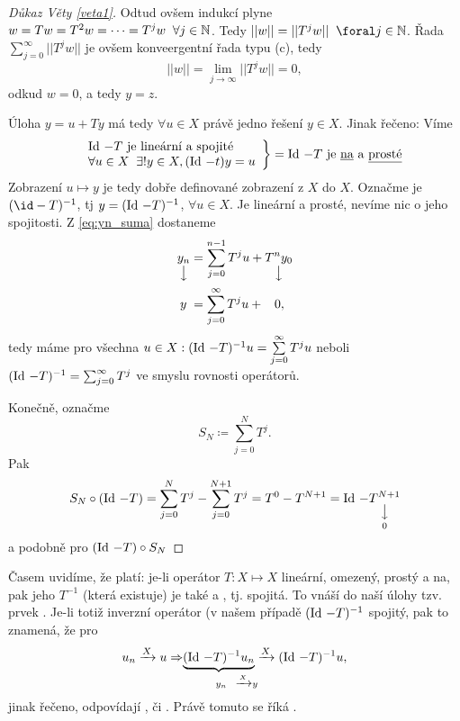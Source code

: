 \begin{proof}[Důkaz Věty \ref{veta1}]
Odtud ovšem indukcí plyne $w=Tw=T^2w=\dots =T^jw \;\; \forall j\in \mathbb{N}$. Tedy $||w||=||T^jw||\;\; \foral j\in \N$. Řada $\sum_{j=0}^\infty||T^j w||$ je ovšem konveergentní řada typu (c), tedy 
$$||w||=\lim\limits_{j\rightarrow\infty}||T^jw||=0,$$
odkud $w=0$, a tedy $y=z$.

Úloha $y=u+Ty$ má tedy $\forall u\in X$ právě jedno řešení $y\in X$. Jinak řečeno: Víme \begin{equation*}
    \begin{split}
        \left.
    \begin{array}{ll}
        &\operatorname{Id}\,-T \text{ je lineární a spojité} \\
        &\forall u\in X\;\;\exists ! y\in X, (\operatorname{Id}\,-t)y=u
    \end{array}
        \right \}=\operatorname{Id}\,-T \text{ je \underline{na} a \underline{prosté}}
    \end{split}
\end{equation*}
Zobrazení $u\mapsto y$ je tedy dobře definované zobrazení z $X$ do $X$. Označme je $(\id -T)^{-1}$, tj $y=(\operatorname{Id}\,-T)^{-1}$, $\forall u\in X$. Je lineární a prosté, nevíme nic o jeho spojitosti.
Z \ref{eq:yn_suma} dostaneme 
\begin{equation*}
    \begin{split}
        \underset{\big\downarrow}{y_n} &= \sum\limits_{j=0}^{n-1}T^ju+\underset{\big\downarrow}{T^ny_0}\\
        y\;&=\sum\limits_{j=0}^\infty T^ju+\;\;\;0,
    \end{split}
\end{equation*}
tedy máme pro všechna $u\in X: (\operatorname{Id}\,-T)^{-1}u=\sum\limits_{j=0}^\infty T^ju$ neboli $(\operatorname{Id}\,-T)^{-1}=\sum_{j=0}^\infty T^j$ ve smyslu rovnosti operátorů.

Konečně, označme
$$S_N\coloneqq \sum\limits_{j=0}^N T^j.$$
Pak 
$$S_N\circ(\operatorname{Id}\,-T)=\sum\limits_{j=0}^N T^j-\sum\limits_{j=0}^{N+1} T^j = T^0-T^{N+1}=\operatorname{Id}\,-\underset{0}{\underset{\big\downarrow}{T^{N+1}}}$$
a podobně pro $(\operatorname{Id}\,-T)\circ S_N$
\end{proof}

\Poznamka
Časem uvidíme, že platí: je-li operátor $T:X\mapsto X$ lineární, omezený, prostý a na, pak jeho  $T^{-1}$ (která existuje) je také  a , tj. spojitá. To vnáší do naší úlohy tzv. prvek . Je-li totiž inverzní operátor (v našem případě $(\operatorname{Id}\,-T)^{-1}$ spojitý, pak to znamená, že pro 
$$u_n\xrightarrow{X}u\Rightarrow \underset{\quad\; y_n\;\;\;\xrightarrow{X}y}{\underbrace{(\operatorname{Id}\,-T)^{-1}u_n}\xrightarrow{X}}(\operatorname{Id}\,-T)^{-1}u,$$
jinak řečeno,  odpovídají , či . Právě tomuto se říká .

